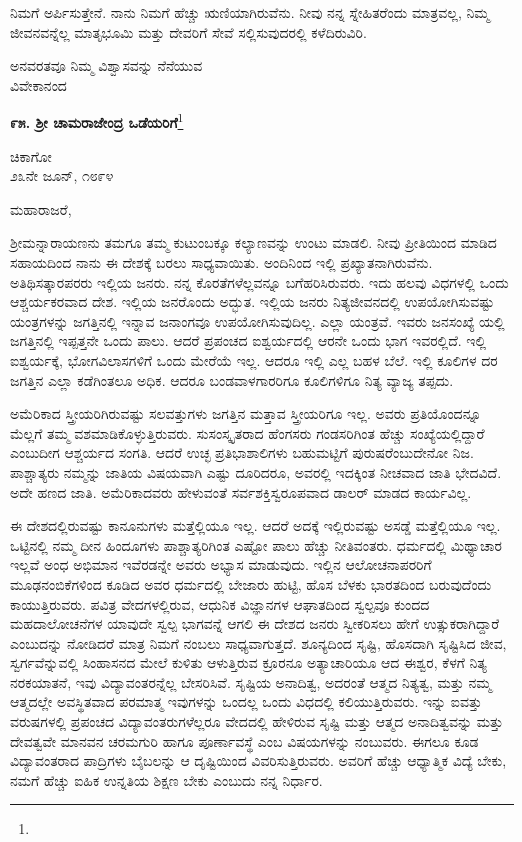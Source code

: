 ನಿಮಗೆ ಅರ್ಪಿಸುತ್ತೇನೆ. ನಾನು ನಿಮಗೆ ಹೆಚ್ಚು ಋಣಿಯಾಗಿರುವೆನು. ನೀವು ನನ್ನ ಸ್ನೇಹಿತರೆಂದು ಮಾತ್ರವಲ್ಲ, ನಿಮ್ಮ ಜೀವನವನ್ನೆಲ್ಲ ಮಾತೃಭೂಮಿ ಮತ್ತು ದೇವರಿಗೆ ಸೇವೆ ಸಲ್ಲಿಸುವುದರಲ್ಲಿ ಕಳೆದಿರುವಿರಿ.

{\flushright
ಅನವರತವೂ ನಿಮ್ಮ ವಿಶ್ವಾಸವನ್ನು ನೆನೆಯುವ\\ವಿವೇಕಾನಂದ\par}

\newpage

\begin{center}
\textbf{೯೫. ಶ‍್ರೀ ಚಾಮರಾಜೇಂದ್ರ ಒಡೆಯರಿಗೆ}\footnote{}
\end{center}

\begin{flushright}
ಚಿಕಾಗೋ\\೨೩ನೇ ಜೂನ್, ೧೮೯೪
\end{flushright}

\noindent
ಮಹಾರಾಜರೆ,

ಶ‍್ರೀಮನ್ನಾರಾಯಣನು ತಮಗೂ ತಮ್ಮ ಕುಟುಂಬಕ್ಕೂ ಕಲ್ಯಾಣವನ್ನು ಉಂಟು ಮಾಡಲಿ. ನೀವು ಪ್ರೀತಿಯಿಂದ ಮಾಡಿದ ಸಹಾಯದಿಂದ ನಾನು ಈ ದೇಶಕ್ಕೆ ಬರಲು ಸಾಧ್ಯವಾಯಿತು. ಅಂದಿನಿಂದ ಇಲ್ಲಿ ಪ್ರಖ್ಯಾತನಾಗಿರುವೆನು. ಅತಿಥಿಸತ್ಕಾರಪರರು ಇಲ್ಲಿಯ ಜನರು. ನನ್ನ ಕೊರತೆಗಳೆಲ್ಲವನ್ನೂ ಬಗೆಹರಿಸಿರುವರು. ಇದು ಹಲವು ವಿಧಗಳಲ್ಲಿ ಒಂದು ಆಶ್ಚರ್ಯಕರವಾದ ದೇಶ. ಇಲ್ಲಿಯ ಜನರೊಂದು ಅದ್ಭುತ. ಇಲ್ಲಿಯ ಜನರು ನಿತ್ಯಜೀವನದಲ್ಲಿ ಉಪಯೋಗಿಸುವಷ್ಟು ಯಂತ್ರಗಳನ್ನು ಜಗತ್ತಿನಲ್ಲಿ ಇನ್ನಾವ ಜನಾಂಗವೂ ಉಪಯೋಗಿಸುವುದಿಲ್ಲ. ಎಲ್ಲಾ ಯಂತ್ರವೆ. ಇವರು ಜನಸಂಖ್ಯೆ ಯಲ್ಲಿ ಜಗತ್ತಿನಲ್ಲಿ ಇಪ್ಪತ್ತನೇ ಒಂದು ಪಾಲು. ಆದರೆ ಪ್ರಪಂಚದ ಐಶ್ವರ್ಯದಲ್ಲಿ ಆರನೇ ಒಂದು ಭಾಗ ಇವರಲ್ಲಿದೆ. ಇಲ್ಲಿ ಐಶ್ವರ್ಯಕ್ಕೆ, ಭೋಗವಿಲಾಸಗಳಿಗೆ ಒಂದು ಮೇರೆಯೆ ಇಲ್ಲ. ಆದರೂ ಇಲ್ಲಿ ಎಲ್ಲ ಬಹಳ ಬೆಲೆ. ಇಲ್ಲಿ ಕೂಲಿಗಳ ದರ ಜಗತ್ತಿನ ಎಲ್ಲಾ ಕಡೆಗಿಂತಲೂ ಅಧಿಕ. ಆದರೂ ಬಂಡವಾಳಗಾರರಿಗೂ ಕೂಲಿಗಳಿಗೂ ನಿತ್ಯ ವ್ಯಾಜ್ಯ ತಪ್ಪದು.

ಅಮೆರಿಕಾದ ಸ್ತ್ರೀಯರಿಗಿರುವಷ್ಟು ಸಲವತ್ತುಗಳು ಜಗತ್ತಿನ ಮತ್ತಾವ ಸ್ತ್ರೀಯರಿಗೂ ಇಲ್ಲ. ಅವರು ಪ್ರತಿಯೊಂದನ್ನೂ ಮೆಲ್ಲಗೆ ತಮ್ಮ ವಶಮಾಡಿಕೊಳ್ಳುತ್ತಿರುವರು. ಸುಸಂಸ್ಕೃತರಾದ ಹೆಂಗಸರು ಗಂಡಸರಿಗಿಂತ ಹೆಚ್ಚು ಸಂಖ್ಯೆಯಲ್ಲಿದ್ದಾರೆ ಎಂಬುದೀಗ ಆಶ್ಚರ್ಯದ ಸಂಗತಿ. ಆದರೆ ಉಚ್ಛ ಪ್ರತಿಭಾಶಾಲಿಗಳು ಬಹುಮಟ್ಟಿಗೆ ಪುರುಷರೆಂಬುದೇನೋ ನಿಜ. ಪಾಶ್ಚಾತ್ಯರು ನಮ್ಮನ್ನು ಜಾತಿಯ ವಿಷಯವಾಗಿ ಎಷ್ಟು ದೂರಿದರೂ, ಅವರಲ್ಲಿ ಇದಕ್ಕಿಂತ ನೀಚವಾದ ಜಾತಿ ಭೇದವಿದೆ. ಅದೇ ಹಣದ ಜಾತಿ. ಅಮೆರಿಕಾದವರು ಹೇಳುವಂತೆ ಸರ್ವಶಕ್ತಿಸ್ವರೂಪವಾದ ಡಾಲರ್‌ ಮಾಡದ ಕಾರ್ಯವಿಲ್ಲ.

ಈ ದೇಶದಲ್ಲಿರುವಷ್ಟು ಕಾನೂನುಗಳು ಮತ್ತೆಲ್ಲಿಯೂ ಇಲ್ಲ. ಆದರೆ ಅದಕ್ಕೆ ಇಲ್ಲಿರುವಷ್ಟು ಅಸಡ್ಡೆ ಮತ್ತೆಲ್ಲಿಯೂ ಇಲ್ಲ. ಒಟ್ಟಿನಲ್ಲಿ ನಮ್ಮ ದೀನ ಹಿಂದೂಗಳು ಪಾಶ್ಚಾತ್ಯರಿಗಿಂತ ಎಷ್ಟೋ ಪಾಲು ಹೆಚ್ಚು ನೀತಿವಂತರು. ಧರ್ಮದಲ್ಲಿ ಮಿಥ್ಯಾಚಾರ ಇಲ್ಲವೆ ಅಂಧ ಅಭಿಮಾನ ಇವೆರಡನ್ನೇ ಅವರು ಅಭ್ಯಾಸ ಮಾಡುವುದು. ಇಲ್ಲಿನ ಆಲೋಚನಾಪರರಿಗೆ ಮೂಢನಂಬಿಕೆಗಳಿಂದ ಕೂಡಿದ ಅವರ ಧರ್ಮದಲ್ಲಿ ಬೇಜಾರು ಹುಟ್ಟಿ, ಹೊಸ ಬೆಳಕು ಭಾರತದಿಂದ ಬರುವುದೆಂದು ಕಾಯುತ್ತಿರುವರು. ಪವಿತ್ರ ವೇದಗಳಲ್ಲಿರುವ, ಆಧುನಿಕ ವಿಜ್ಞಾನಗಳ ಆಘಾತದಿಂದ ಸ್ವಲ್ಪವೂ ಕುಂದದ ಮಹದಾಲೋಚನೆಗಳ ಯಾವುದೇ ಸ್ವಲ್ಪ ಭಾಗವನ್ನೆ ಆಗಲಿ ಈ ದೇಶದ ಜನರು ಸ್ವೀಕರಿಸಲು ಹೇಗೆ ಉತ್ಸುಕರಾಗಿದ್ದಾರೆ ಎಂಬುದನ್ನು ನೋಡಿದರೆ ಮಾತ್ರ ನಿಮಗೆ ನಂಬಲು ಸಾಧ್ಯವಾಗುತ್ತದೆ. ಶೂನ್ಯದಿಂದ ಸೃಷ್ಟಿ, ಹೊಸದಾಗಿ ಸೃಷ್ಟಿಸಿದ ಜೀವ, ಸ್ವರ್ಗವೆನ್ನುವಲ್ಲಿ ಸಿಂಹಾಸನದ ಮೇಲೆ ಕುಳಿತು ಆಳುತ್ತಿರುವ ಕ್ರೂರನೂ ಅತ್ಯಾಚಾರಿಯೂ ಆದ ಈಶ್ವರ, ಕೆಳಗೆ ನಿತ್ಯ ನರಕಯಾತನೆ, ಇವು ವಿದ್ಯಾವಂತರನ್ನೆಲ್ಲ ಬೇಸರಿಸಿವೆ. ಸೃಷ್ಟಿಯ ಅನಾದಿತ್ವ, ಅದರಂತೆ ಆತ್ಮದ ನಿತ್ಯತ್ವ, ಮತ್ತು ನಮ್ಮ ಆತ್ಮದಲ್ಲೇ ಅವಸ್ಥಿತವಾದ ಪರಮಾತ್ಮ \enginline{-} ಇವುಗಳನ್ನು ಒಂದಲ್ಲ ಒಂದು ವಿಧದಲ್ಲಿ ಕಲಿಯುತ್ತಿರುವರು. ಇನ್ನು ಐವತ್ತು ವರುಷಗಳಲ್ಲಿ ಪ್ರಪಂಚದ ವಿದ್ಯಾವಂತರುಗಳೆಲ್ಲರೂ ವೇದದಲ್ಲಿ ಹೇಳಿರುವ ಸೃಷ್ಟಿ ಮತ್ತು ಆತ್ಮದ ಅನಾದಿತ್ವವನ್ನು ಮತ್ತು ದೇವತ್ವವೇ ಮಾನವನ ಚರಮಗುರಿ ಹಾಗೂ ಪೂರ್ಣಾವಸ್ಥೆ ಎಂಬ ವಿಷಯಗಳನ್ನು ನಂಬುವರು. ಈಗಲೂ ಕೂಡ ವಿದ್ಯಾವಂತರಾದ ಪಾದ್ರಿಗಳು ಬೈಬಲನ್ನು ಆ ದೃಷ್ಟಿಯಿಂದ ವಿವರಿಸುತ್ತಿರುವರು. ಅವರಿಗೆ ಹೆಚ್ಚು ಆಧ್ಯಾತ್ಮಿಕ ವಿದ್ಯೆ ಬೇಕು, ನಮಗೆ ಹೆಚ್ಚು ಐಹಿಕ ಉನ್ನತಿಯ ಶಿಕ್ಷಣ ಬೇಕು ಎಂಬುದು ನನ್ನ ನಿರ್ಧಾರ.

